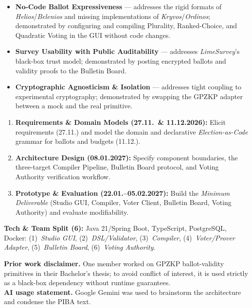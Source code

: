\documentclass[11pt,a4paper]{article}
\newcommand{\pibapart}[1]{\vspace{0.4em}{\large\textbf{#1}}\par}
\begin{document}
\pibapart{Benefits}
\begin{itemize}
  \item \textbf{No-Code Ballot Expressiveness} --- addresses the rigid formats of \emph{Helios}/\emph{Belenios} and missing implementations of \emph{Kryvos}/\emph{Ordinos}; demonstrated by configuring and compiling Plurality, Ranked-Choice, and Quadratic Voting in the GUI without code changes.
  \item \textbf{Survey Usability with Public Auditability} --- addresses \emph{LimeSurvey}'s black-box trust model; demonstrated by posting encrypted ballots and validity proofs to the Bulletin Board.
  \item \textbf{Cryptographic Agnosticism \& Isolation} --- addresses tight coupling to experimental cryptography; demonstrated by swapping the GPZKP adapter between a mock and the real primitive.
\end{itemize}

\pibapart{Action}
\begin{enumerate}
  \item \textbf{Requirements \& Domain Models (27.11.\ \& 11.12.2026):} Elicit requirements (27.11.) and model the domain and declarative \emph{Election-as-Code} grammar for ballots and budgets (11.12.).
  \item \textbf{Architecture Design (08.01.2027):} Specify component boundaries, the three-target Compiler Pipeline, Bulletin Board protocol, and Voting Authority verification workflow.
  \item \textbf{Prototype \& Evaluation (22.01.--05.02.2027):} Build the \emph{Minimum Deliverable} (Studio GUI, Compiler, Voter Client, Bulletin Board, Voting Authority) and evaluate modifiability.
\end{enumerate}
\textbf{Tech \& Team Split (6):} Java 21/Spring Boot, TypeScript, PostgreSQL, Docker: (1)~\emph{Studio GUI}, (2)~\emph{DSL/Validator}, (3)~\emph{Compiler}, (4)~\emph{Voter/Prover Adapter}, (5)~\emph{Bulletin Board}, (6)~\emph{Voting Authority}.

\vfill
{\small\textbf{Prior work disclaimer.} One member worked on GPZKP ballot-validity primitives in their Bachelor's thesis; to avoid conflict of interest, it is used strictly as a black-box dependency without runtime guarantees.\\
\textbf{AI usage statement.} Google Gemini was used to brainstorm the architecture and condense the PIBA text.}
\end{document}
